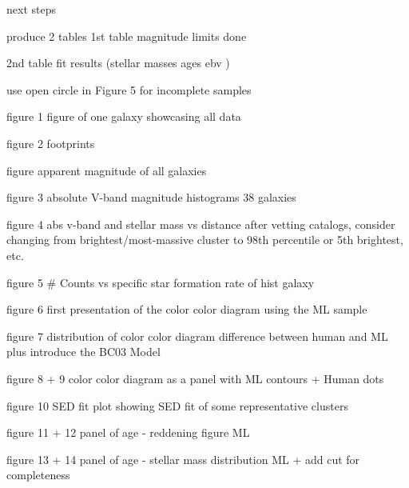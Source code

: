 next steps

produce 2 tables
1st table magnitude limits done

2nd table fit results (stellar masses ages  ebv )

use open circle in Figure 5 for incomplete samples





figure 1
figure of one galaxy showcasing all data

figure 2
footprints

figure
apparent magnitude of all galaxies

figure 3 
absolute V-band magnitude histograms 38 galaxies

figure 4 
abs v-band and stellar mass vs distance
after vetting catalogs, consider changing from brightest/most-massive cluster to 98th percentile or 5th brightest, etc.

figure 5 
# Counts vs specific star formation rate of hist galaxy

figure 6
first presentation of the color color diagram using the ML sample

figure 7 
distribution of color color diagram difference between human and ML plus introduce the BC03 Model

figure 8 + 9
color color diagram as a panel with ML contours + Human dots

figure 10 
SED fit plot showing SED fit of some representative clusters

figure 11 + 12
panel of age - reddening figure ML

figure 13 + 14 
panel of age - stellar mass distribution ML 
+ add cut for completeness


